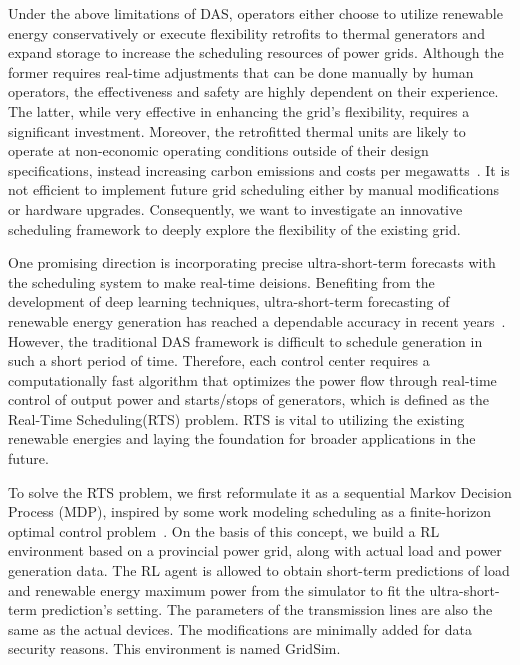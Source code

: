 Under the above limitations of DAS, operators either choose to utilize renewable energy conservatively or execute flexibility retrofits to thermal generators and expand storage to increase the scheduling resources of power grids. 
Although the former requires real-time adjustments that can be done manually by human operators, the effectiveness and safety are highly dependent on their experience. The latter, while very effective in enhancing the grid's flexibility, requires a significant investment. 
Moreover, the retrofitted thermal units are likely to operate at non-economic operating conditions outside of their design specifications, instead increasing carbon emissions and costs per megawatts~\cite{chen2021flexible}. 
It is not efficient to implement future grid scheduling either by manual modifications or hardware upgrades.
Consequently, we want to investigate an innovative scheduling framework to deeply explore the flexibility of the existing grid.

One promising direction is incorporating precise ultra-short-term forecasts with the scheduling system to make real-time deisions.
Benefiting from the development of deep learning techniques, ultra-short-term forecasting of renewable energy generation has reached a dependable accuracy in recent years~\cite{wu2021ultra,tawn2022review}. 
However, the traditional DAS framework is difficult to schedule generation in such a short period of time.
Therefore, each control center requires a computationally fast algorithm that optimizes the power flow through real-time control of output power and starts/stops of generators, which is defined as the Real-Time Scheduling(RTS) problem. 
RTS is vital to utilizing the existing renewable energies and laying the foundation for broader applications in the future.  


To solve the RTS problem, we first reformulate it as a sequential Markov Decision Process (MDP), inspired by some work modeling scheduling as a finite-horizon optimal control problem~\cite{chandy2010simple}. On the basis of this concept, we build a RL environment based on a provincial power grid, along with actual load and power generation data. 
The RL agent is allowed to obtain short-term predictions of load and renewable energy maximum power from the simulator to fit the ultra-short-term prediction's setting. The parameters of the transmission lines are also the same as the actual devices. The modifications are minimally added for data security reasons. This environment is named GridSim. 


